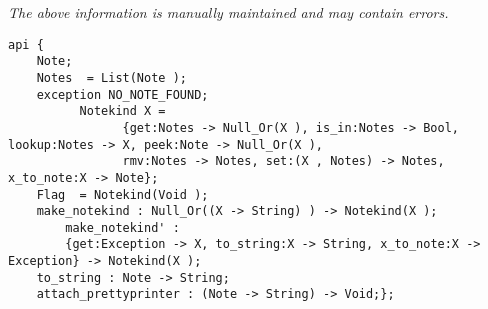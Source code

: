 \label{api:Note}

{\tiny \it The above information is manually maintained and may contain errors.}
\begin{verbatim}
api {
    Note;
    Notes  = List(Note );
    exception NO_NOTE_FOUND;
          Notekind X =
                {get:Notes -> Null_Or(X ), is_in:Notes -> Bool, lookup:Notes -> X, peek:Note -> Null_Or(X ),
                rmv:Notes -> Notes, set:(X , Notes) -> Notes, x_to_note:X -> Note};
    Flag  = Notekind(Void );
    make_notekind : Null_Or((X -> String) ) -> Notekind(X );
        make_notekind' :
        {get:Exception -> X, to_string:X -> String, x_to_note:X -> Exception} -> Notekind(X );
    to_string : Note -> String;
    attach_prettyprinter : (Note -> String) -> Void;};
\end{verbatim}
